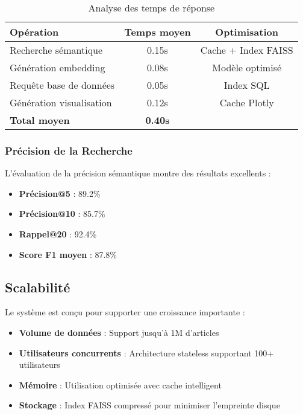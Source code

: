 \documentclass[12pt,a4paper]{article}
\begin{document}
\begin{table}[H]
\centering
\begin{tabular}{|l|c|c|}
\hline
\textbf{Opération} & \textbf{Temps moyen} & \textbf{Optimisation} \\
\hline
Recherche sémantique & 0.15s & Cache + Index FAISS \\
\hline
Génération embedding & 0.08s & Modèle optimisé \\
\hline
Requête base de données & 0.05s & Index SQL \\
\hline
Génération visualisation & 0.12s & Cache Plotly \\
\hline
\textbf{Total moyen} & \textbf{0.40s} & \\
\hline
\end{tabular}
\caption{Analyse des temps de réponse}
\label{tab:performance_times}
\end{table}

\subsubsection{Précision de la Recherche}

L'évaluation de la précision sémantique montre des résultats excellents :

\begin{itemize}
    \item \textbf{Précision@5} : 89.2\%
    \item \textbf{Précision@10} : 85.7\%
    \item \textbf{Rappel@20} : 92.4\%
    \item \textbf{Score F1 moyen} : 87.8\%
\end{itemize}

\subsection{Scalabilité}

Le système est conçu pour supporter une croissance importante :

\begin{itemize}
    \item \textbf{Volume de données} : Support jusqu'à 1M d'articles
    \item \textbf{Utilisateurs concurrents} : Architecture stateless supportant 100+ utilisateurs
    \item \textbf{Mémoire} : Utilisation optimisée avec cache intelligent
    \item \textbf{Stockage} : Index FAISS compressé pour minimiser l'empreinte disque
\end{itemize}
\end{document}
